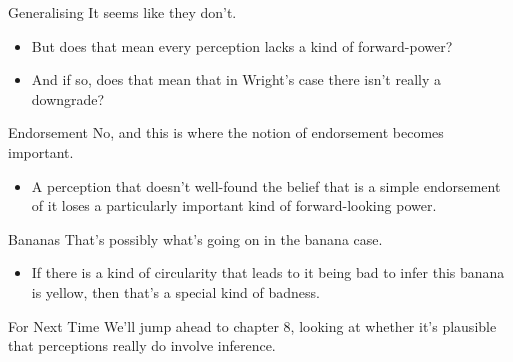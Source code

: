 \documentclass[
  17pt,
  letterpaper,
  ignorenonframetext,
  aspectratio=169,
  handout,
  xcolor={dvipsnames}]{beamer}
\providecommand{\tightlist}{%
  \setlength{\itemsep}{0pt}\setlength{\parskip}{0pt}}\usepackage{longtable,booktabs,array}
\begin{document}
\begin{frame}{Generalising}
\protect\hypertarget{generalising-1}{}
It seems like they don't.

\begin{itemize}[<+->]
\tightlist
\item
  But does that mean every perception lacks a kind of forward-power?
\item
  And if so, does that mean that in Wright's case there isn't really a
  downgrade?
\end{itemize}
\end{frame}

\begin{frame}{Endorsement}
\protect\hypertarget{endorsement-2}{}
No, and this is where the notion of endorsement becomes important.

\begin{itemize}[<+->]
\tightlist
\item
  A perception that doesn't well-found the belief that is a simple
  endorsement of it loses a particularly important kind of
  forward-looking power.
\end{itemize}
\end{frame}

\begin{frame}{Bananas}
\protect\hypertarget{bananas}{}
That's possibly what's going on in the banana case.

\begin{itemize}[<+->]
\tightlist
\item
  If there is a kind of circularity that leads to it being bad to infer
  this banana is yellow, then that's a special kind of badness.
\end{itemize}
\end{frame}

\begin{frame}{For Next Time}
\protect\hypertarget{for-next-time}{}
We'll jump ahead to chapter 8, looking at whether it's plausible that
perceptions really do involve inference.
\end{frame}
\end{document}
